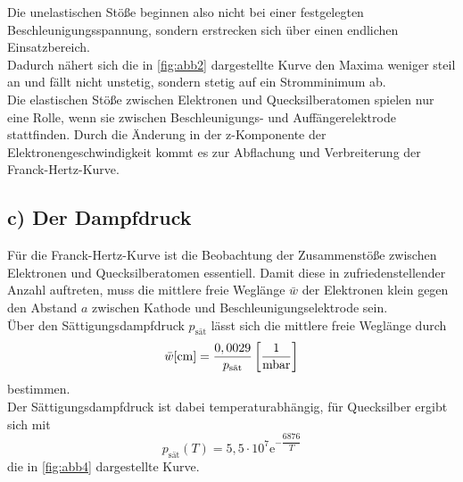Die unelastischen Stöße beginnen also nicht bei einer festgelegten Beschleunigungsspannung, sondern erstrecken
sich über einen endlichen Einsatzbereich. \\

Dadurch nähert sich die in \autoref{fig:abb2} dargestellte Kurve den Maxima weniger steil an und fällt nicht
unstetig, sondern stetig auf ein Stromminimum ab. \\

Die elastischen Stöße zwischen Elektronen und Quecksilberatomen spielen nur eine Rolle, wenn sie zwischen
Beschleunigungs- und Auffängerelektrode stattfinden.
Durch die Änderung in der z-Komponente der Elektronengeschwindigkeit kommt es zur Abflachung und Verbreiterung
der Franck-Hertz-Kurve.


\subsection*{c) Der Dampfdruck}

Für die Franck-Hertz-Kurve ist die Beobachtung der Zusammenstöße zwischen Elektronen und Quecksilberatomen
essentiell.
Damit diese in zufriedenstellender Anzahl auftreten, muss die mittlere freie Weglänge $\bar{w}$ der Elektronen
klein gegen den Abstand $a$ zwischen Kathode und Beschleunigungselektrode sein. \\

Über den Sättigungsdampfdruck $p_\text{sät}$ lässt sich die mittlere freie Weglänge durch
\begin{equation}
    \bar{w} [\unit{\centi\meter}] = \frac{0,0029}{p_\text{sät}} \left[\unit{\frac{1}{\milli\bar}} \right]
    \label{eq:mittfreiweg}
\end{equation}
bestimmen. \\

Der Sättigungsdampfdruck ist dabei temperaturabhängig, für Quecksilber ergibt sich mit
\begin{equation*}
    p_\text{sät} (T) = 5,5 \cdot 10^7 \text{e}^{-\dfrac{6876}{T}}
    \label{eq:dampfdruck}
\end{equation*}
die in \autoref{fig:abb4} dargestellte Kurve.

